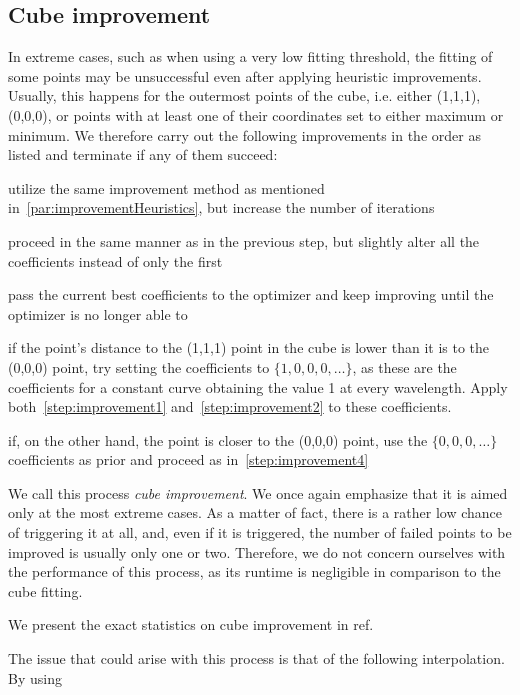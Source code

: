 \subsection{Cube improvement} \label{ssec:cubeImprovement}

In extreme cases, such as when using a very low fitting threshold, the fitting of some points may be unsuccessful even after applying heuristic improvements. Usually, this happens for the outermost points of the cube, i.e. either (1,1,1), (0,0,0), or points with at least one of their coordinates set to either maximum or minimum. We therefore carry out the following improvements in the order as listed and terminate if any of them succeed: 
\begin{steps}
	\item utilize the same improvement method as mentioned in~\cref{par:improvementHeuristics}, but increase the number of iterations \label{step:improvement1}
	\item proceed in the same manner as in the previous step, but slightly alter all the coefficients instead of only the first \label{step:improvement2}
	\item pass the current best coefficients to the optimizer and keep improving until the optimizer is no longer able to
	\item if the point's distance to the (1,1,1) point in the cube is lower than it is to the (0,0,0) point, try setting the coefficients to $\{1, 0, 0, 0, \ldots\}$, as these are the coefficients for a constant curve obtaining the value 1 at every wavelength. Apply both~\ref{step:improvement1} and~\ref{step:improvement2} to these coefficients.\label{step:improvement4}
	\item if, on the other hand, the point is closer to the (0,0,0) point, use the $\{0, 0, 0 ,\ldots\}$ coefficients as prior and proceed as in~\ref{step:improvement4}
\end{steps}

We call this process \emph{cube improvement}. We once again emphasize that it is aimed only at the most extreme cases. As a matter of fact, there is a rather low chance of triggering it at all, and, even if it is triggered, the number of failed points to be improved is usually only one or two. Therefore, we do not concern ourselves with the performance of this process, as its runtime is negligible in comparison to the cube fitting.

We present the exact statistics on cube improvement in ref.

The issue that could arise with this process is that of the following interpolation. By using

